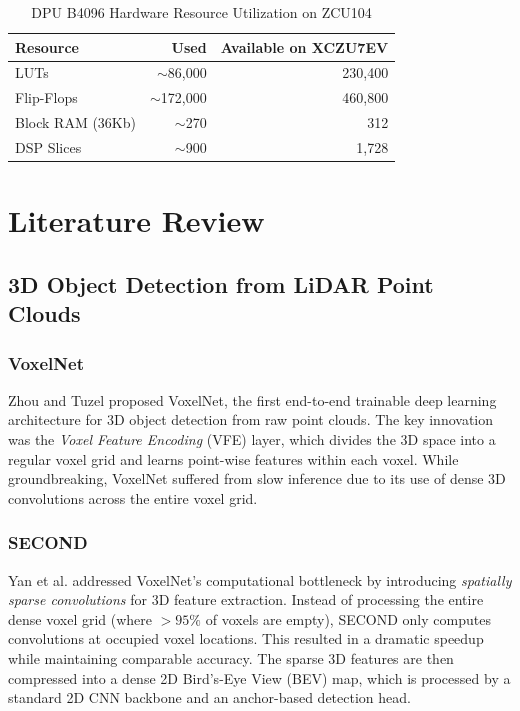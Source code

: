 \documentclass[12pt, a4paper]{report}
\begin{document}
\begin{table}[H]
\centering
\caption{DPU B4096 Hardware Resource Utilization on ZCU104}
\label{tab:dpu_resources}
\begin{tabular}{@{}lrr@{}}
\toprule
\textbf{Resource} & \textbf{Used} & \textbf{Available on XCZU7EV} \\
\midrule
LUTs & $\sim$86,000 & 230,400 \\
Flip-Flops & $\sim$172,000 & 460,800 \\
Block RAM (36Kb) & $\sim$270 & 312 \\
DSP Slices & $\sim$900 & 1,728 \\
\bottomrule
\end{tabular}
\end{table}


\chapter{Literature Review}

\section{3D Object Detection from LiDAR Point Clouds}

\subsection{VoxelNet}
Zhou and Tuzel \cite{voxelnet2018} proposed VoxelNet, the first end-to-end trainable deep learning architecture for 3D object detection from raw point clouds. The key innovation was the \textit{Voxel Feature Encoding} (VFE) layer, which divides the 3D space into a regular voxel grid and learns point-wise features within each voxel. While groundbreaking, VoxelNet suffered from slow inference due to its use of dense 3D convolutions across the entire voxel grid.

\subsection{SECOND}
Yan et al. \cite{second2018} addressed VoxelNet's computational bottleneck by introducing \textit{spatially sparse convolutions} for 3D feature extraction. Instead of processing the entire dense voxel grid (where $>95\%$ of voxels are empty), SECOND only computes convolutions at occupied voxel locations. This resulted in a dramatic speedup while maintaining comparable accuracy. The sparse 3D features are then compressed into a dense 2D Bird's-Eye View (BEV) map, which is processed by a standard 2D CNN backbone and an anchor-based detection head.
\end{document}
